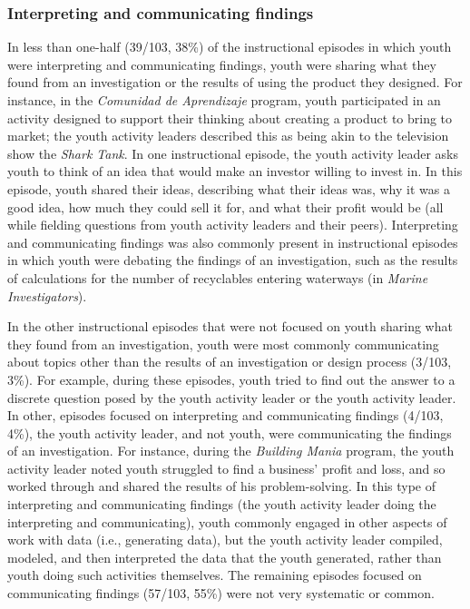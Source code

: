 \documentclass[]{book}
\theoremstyle{definition}
\theoremstyle{definition}
\theoremstyle{definition}
\theoremstyle{remark}
\begin{document}
\subsubsection{Interpreting and communicating
findings}\label{interpreting-and-communicating-findings}

In less than one-half (39/103, 38\%) of the instructional episodes in
which youth were interpreting and communicating findings, youth were
sharing what they found from an investigation or the results of using
the product they designed. For instance, in the \emph{Comunidad de
Aprendizaje} program, youth participated in an activity designed to
support their thinking about creating a product to bring to market; the
youth activity leaders described this as being akin to the television
show the \emph{Shark Tank}. In one instructional episode, the youth
activity leader asks youth to think of an idea that would make an
investor willing to invest in. In this episode, youth shared their
ideas, describing what their ideas was, why it was a good idea, how much
they could sell it for, and what their profit would be (all while
fielding questions from youth activity leaders and their peers).
Interpreting and communicating findings was also commonly present in
instructional episodes in which youth were debating the findings of an
investigation, such as the results of calculations for the number of
recyclables entering waterways (in \emph{Marine Investigators}).

In the other instructional episodes that were not focused on youth
sharing what they found from an investigation, youth were most commonly
communicating about topics other than the results of an investigation or
design process (3/103, 3\%). For example, during these episodes, youth
tried to find out the answer to a discrete question posed by the youth
activity leader or the youth activity leader. In other, episodes focused
on interpreting and communicating findings (4/103, 4\%), the youth
activity leader, and not youth, were communicating the findings of an
investigation. For instance, during the \emph{Building Mania} program,
the youth activity leader noted youth struggled to find a business'
profit and loss, and so worked through and shared the results of his
problem-solving. In this type of interpreting and communicating findings
(the youth activity leader doing the interpreting and communicating),
youth commonly engaged in other aspects of work with data (i.e.,
generating data), but the youth activity leader compiled, modeled, and
then interpreted the data that the youth generated, rather than youth
doing such activities themselves. The remaining episodes focused on
communicating findings (57/103, 55\%) were not very systematic or
common.
\end{document}
